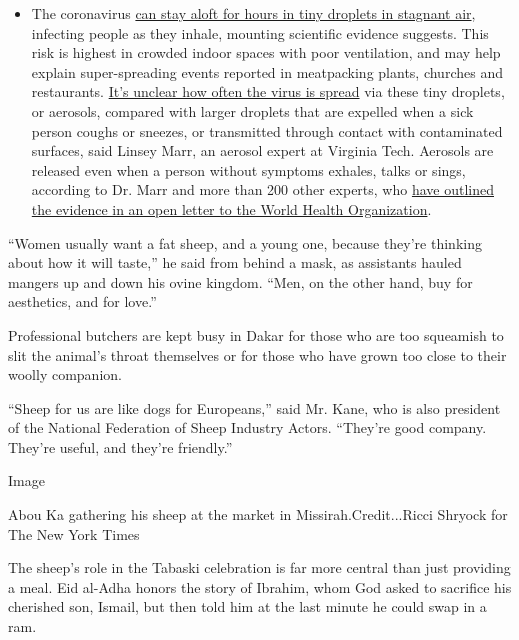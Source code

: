 \begin{itemize}
  \begin{itemize}
  \tightlist
  \item
    The coronavirus
    \href{https://www.nytimes3xbfgragh.onion/2020/07/04/health/239-experts-with-one-big-claim-the-coronavirus-is-airborne.html?action=click\&pgtype=Article\&state=default\&region=MAIN_CONTENT_3\&context=storylines_faq}{can
    stay aloft for hours in tiny droplets in stagnant air}, infecting
    people as they inhale, mounting scientific evidence suggests. This
    risk is highest in crowded indoor spaces with poor ventilation, and
    may help explain super-spreading events reported in meatpacking
    plants, churches and restaurants.
    \href{https://www.nytimes3xbfgragh.onion/2020/07/06/health/coronavirus-airborne-aerosols.html?action=click\&pgtype=Article\&state=default\&region=MAIN_CONTENT_3\&context=storylines_faq}{It's
    unclear how often the virus is spread} via these tiny droplets, or
    aerosols, compared with larger droplets that are expelled when a
    sick person coughs or sneezes, or transmitted through contact with
    contaminated surfaces, said Linsey Marr, an aerosol expert at
    Virginia Tech. Aerosols are released even when a person without
    symptoms exhales, talks or sings, according to Dr. Marr and more
    than 200 other experts, who
    \href{https://academic.oup.com/cid/article/doi/10.1093/cid/ciaa939/5867798}{have
    outlined the evidence in an open letter to the World Health
    Organization}.
  \end{itemize}
\end{itemize}

``Women usually want a fat sheep, and a young one, because they're
thinking about how it will taste,'' he said from behind a mask, as
assistants hauled mangers up and down his ovine kingdom. ``Men, on the
other hand, buy for aesthetics, and for love.''

Professional butchers are kept busy in Dakar for those who are too
squeamish to slit the animal's throat themselves or for those who have
grown too close to their woolly companion.

``Sheep for us are like dogs for Europeans,'' said Mr. Kane, who is also
president of the National Federation of Sheep Industry Actors. ``They're
good company. They're useful, and they're friendly.''

Image

Abou Ka gathering his sheep at the market in Missirah.Credit...Ricci
Shryock for The New York Times

The sheep's role in the Tabaski celebration is far more central than
just providing a meal. Eid al-Adha honors the story of Ibrahim, whom God
asked to sacrifice his cherished son, Ismail, but then told him at the
last minute he could swap in a ram.

